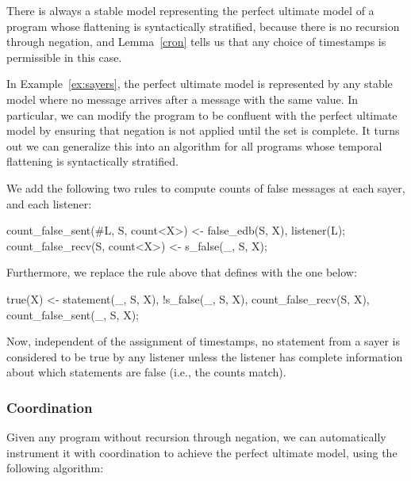 There is always a stable model representing the perfect ultimate model of a \lang program whose flattening is syntactically stratified, because there is no recursion through negation, and Lemma~\ref{cron} tells us that any choice of timestamps is permissible in this case.

In Example~\ref{ex:sayers}, the perfect ultimate model is represented by any stable model where no  message arrives after a  message with the same value.  In particular, we can modify the program to be confluent with the perfect ultimate model by ensuring that negation is not applied until the  set is complete.  It turns out we can generalize this into an algorithm for all \lang programs whose temporal flattening is syntactically stratified.


We add the following two rules to compute counts of false messages at each sayer, and each listener:

\begin{Dedalus}
count_false_sent(#L, S, count<X>) <- false_edb(S, X),
                                     listener(L);
count_false_recv(S, count<X>) <- s_false(_, S, X);
\end{Dedalus}

Furthermore, we replace the rule above that defines  with the one below:

\begin{Dedalus}
true(X) <- statement(_, S, X), !s_false(_, S, X),
           count_false_recv(S, X),
           count_false_sent(_, S, X);
\end{Dedalus}

Now, independent of the assignment of timestamps, no statement from a sayer  is considered to be true by any listener unless the listener has complete information about which statements are false (i.e., the counts match). 



\subsubsection{Coordination}
Given any \lang program without recursion through negation, we can automatically instrument it with coordination to achieve the perfect ultimate model, using the following algorithm:

